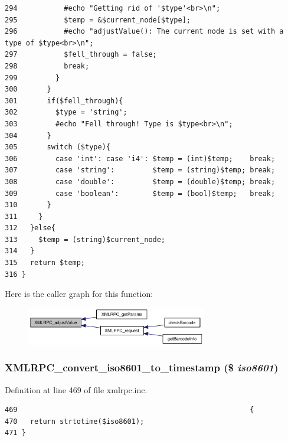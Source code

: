 \begin{Code}
\begin{verbatim}
294           #echo "Getting rid of '$type'<br>\n";
295           $temp = &$current_node[$type];
296           #echo "adjustValue(): The current node is set with a type of $type<br>\n";
297           $fell_through = false;
298           break;
299         }
300       }
301       if($fell_through){
302         $type = 'string';
303         #echo "Fell through! Type is $type<br>\n";
304       }
305       switch ($type){
306         case 'int': case 'i4': $temp = (int)$temp;    break;
307         case 'string':         $temp = (string)$temp; break;
308         case 'double':         $temp = (double)$temp; break;
309         case 'boolean':        $temp = (bool)$temp;   break;
310       }
311     }
312   }else{
313     $temp = (string)$current_node;
314   }
315   return $temp;
316 }
\end{verbatim}
\end{Code}




Here is the caller graph for this function:\nopagebreak
\begin{figure}[H]
\begin{center}
\leavevmode
\includegraphics[width=223pt]{xmlrpc_8inc_d936fe41ae9c3e0b90bd72ffe82a2969_icgraph}
\end{center}
\end{figure}
\hypertarget{xmlrpc_8inc_1d9c2ef61c9f1fd2723d06d1364ef845}{
\subsubsection{\setlength{\rightskip}{0pt plus 5cm}XMLRPC\_\-convert\_\-iso8601\_\-to\_\-timestamp (\$ {\em iso8601})}}
\label{xmlrpc_8inc_1d9c2ef61c9f1fd2723d06d1364ef845}




Definition at line 469 of file xmlrpc.inc.

\begin{Code}\begin{verbatim}469                                                       {
470   return strtotime($iso8601);
471 }
\end{verbatim}
\end{Code}


